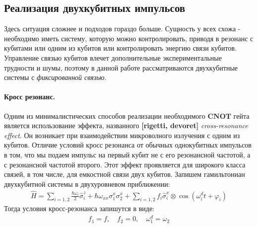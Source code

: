 \documentclass[12pt, twoside]{report}
\numberwithin{equation}{section}
\numberwithin{figure}{section}
\begin{document}
\subsection{Реализация двухкубитных импульсов} \label{par:CNOT}
Здесь ситуация сложнее и подходов гораздо больше. Сущность у всех схожа - необходимо иметь систему, которую можно контролировать, приводя в резонанс с кубитами или одним из кубитов или контролировать энергию связи кубитов. Управление связью кубитов влечет дополнительные экспериментальные трудности и шумы, поэтому в данной работе рассматриваются двухкубитные системы с \textit{фиксированной связью}. 
\paragraph{Кросс резонанс.} Одним из минималистических способов реализации необходимого $\mathbf{CNOT}$ гейта является использование эффекта, названного \textbf{[rigetti, devoret]} \textit{cross-resonance effect}. Он возникает при взаимодействии микроволного излучения с одним из кубитов. Отличие условий кросс резонанса от обычных однокубитных импульсов в том, что мы подаем импульс на первый кубит не с его резонансной частотой, а с резонансной частотой второго. Этот эффект проявляется для широкого класса связей, в том числе, для емкостной связи двух кубитов. Запишем гамильтониан двухкубитной системы в двухуровневом приближении:
\begin{gather*}
\hat{H} = \sum_{i = 1,2} \frac{ \hbar \omega_i }{2} \hat \sigma_i^z + \hbar \omega_{xx} \sigma^x_1 \sigma^x_2 + 
\sum_{i = 1,2} f_i  \hat{\sigma}^x_i \otimes  \cos \left( \omega^d_i t + \varphi_i \right) 
\label{eq:2qubit-ham-2d}
\end{gather*}
Тогда условия кросс-резонанса запишутся в виде:
\begin{gather}
f_1 = f, \quad f_2 = 0, \quad \omega^d_1 = \omega_2
\label{eq:cross-resonance-conditions}
\end{gather}
\end{document}
